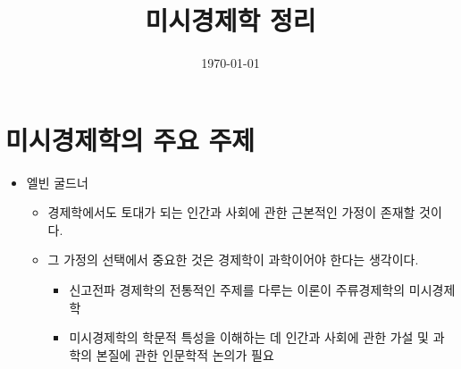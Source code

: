 \documentclass{report}
\title{미시경제학 정리}
\date{\today}
\begin{document}
  \maketitle
  \tableofcontents
  \chapter{미시경제학의 주요 주제}
  \begin{itemize}
    \item 엘빈 굴드너
    \begin{itemize}
        \item 경제학에서도 토대가 되는 인간과 사회에 관한 근본적인 가정이 존재할 것이다.
        \item 그 가정의 선택에서 중요한 것은 경제학이 과학이어야 한다는 생각이다.
        \begin{itemize}
            \item 신고전파 경제학의 전통적인 주제를 다루는 이론이 주류경제학의 미시경제학
            \item 미시경제학의 학문적 특성을 이해하는 데 인간과 사회에 관한 가설 및 과학의 본질에 관한 인문학적 논의가 필요
        \end{itemize}
    \end{itemize}
\end{itemize}
\end{document}
